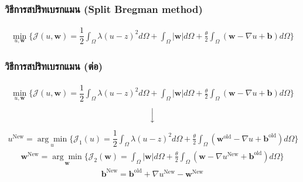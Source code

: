 \documentclass[xcolor=dvipsnames, xetex,serif]{beamer}
\numberwithin{equation}{section}
\begin{document}
		\begin{frame}
			\frametitle{วิธีการสปริทเบรกแมน (Split Bregman method)}
			\begin{align*}
			\min_{u,\boldsymbol{w}} \{ \mathcal{J}(u,\boldsymbol{w}) = \dfrac{1}{2} \int_{\Omega} \lambda(u-z)^2 d\Omega +  \int_{\Omega}  |\boldsymbol{w}|  d\Omega + \frac{\theta}{2} \int_{\Omega} (\boldsymbol{w} - \nabla u + \boldsymbol{b}) d\Omega \}
			\end{align*}
			\let\thefootnote\relax{}
		\end{frame} 
		\begin{frame}
			\frametitle{วิธีการสปริทเบรกแมน (ต่อ)}
				\begin{align*}
			\min_{u,\boldsymbol{w}} \{ \mathcal{J}(u,\boldsymbol{w}) = \dfrac{1}{2} \int_{\Omega} \lambda(u-z)^2 d\Omega +  \int_{\Omega}  |\boldsymbol{w}|  d\Omega + \frac{\theta}{2} \int_{\Omega} (\boldsymbol{w} - \nabla u + \boldsymbol{b}) d\Omega \}
			\end{align*}
			$$ \Big \downarrow$$
			\begin{align*}
			u^{\text{New}}=\underset{u}{\arg\min} \{ \mathcal{J}_1(u) = \dfrac{1}{2} \int_{\Omega} \lambda(u-z)^2 d\Omega + \frac{\theta}{2} \int_{\Omega} (\boldsymbol{w}^{\text{old}} - \nabla u + \boldsymbol{b}^{\text{old}}) d\Omega \}
			\end{align*}
			\begin{align*}
			\boldsymbol{w}^{\text{New}}=\underset{\boldsymbol{w}}{\arg\min} \{ \mathcal{J}_2(\boldsymbol{w}) = \int_{\Omega}  | \boldsymbol{w}|  d\Omega  + \frac{\theta}{2} \int_{\Omega} (\boldsymbol{w} - \nabla u^{\text{New}} + \boldsymbol{b}^{\text{old}}) d\Omega \}
			\end{align*}
			\begin{align*}
			\boldsymbol{b}^{\text{New}}=\boldsymbol{b}^{\text{old}}+\nabla u^{\text{New}}-\boldsymbol{w}^{\text{New}}
			\end{align*}
		\end{frame}  
\end{document}
